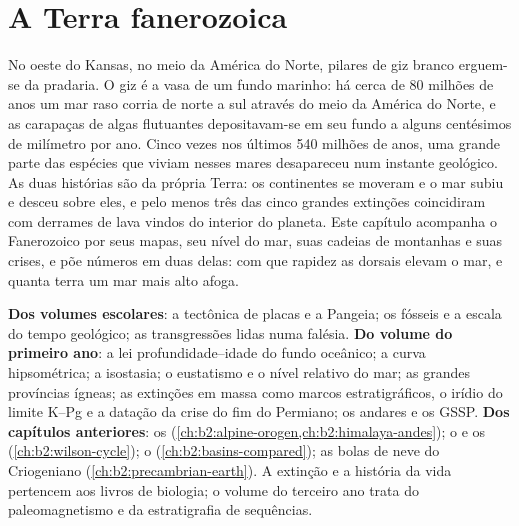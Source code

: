 \chapter{A Terra fanerozoica}\label{ch:b2:phanerozoic-earth}

No oeste do Kansas, no meio da América do Norte, pilares de giz branco erguem-se da
pradaria. O giz é a vasa de um fundo marinho: há cerca de 80 milhões de anos um
mar raso corria de norte a sul através do meio da América do Norte, e as carapaças de
algas flutuantes depositavam-se em seu fundo a alguns centésimos de milímetro por ano. Cinco vezes nos
últimos 540 milhões de anos, uma grande parte das espécies que viviam nesses mares desapareceu num
instante geológico. As duas histórias são da própria Terra: os continentes se moveram e o mar subiu e desceu sobre
eles, e pelo menos três das cinco grandes extinções coincidiram com derrames de lava vindos do interior
do planeta. Este capítulo acompanha o Fanerozoico por seus mapas, seu nível do mar, suas cadeias de
montanhas e suas crises, e põe números em duas delas: com que rapidez as dorsais elevam o mar, e quanta
terra um mar mais alto afoga.

\begin{recall}
\textbf{Dos volumes escolares}: a tectônica de placas e a Pangeia; os fósseis e a escala do tempo
geológico; as transgressões lidas numa falésia. \textbf{Do volume do primeiro ano}: a lei profundidade--idade
do fundo oceânico; a curva hipsométrica; a isostasia; o eustatismo e o nível relativo do mar; as grandes províncias
ígneas; as extinções em massa como marcos estratigráficos, o irídio do limite K--Pg e a
datação da crise do fim do Permiano; os andares e os GSSP. \textbf{Dos capítulos anteriores}: os 
(\cref{ch:b2:alpine-orogen,ch:b2:himalaya-andes}); o  e os 
(\cref{ch:b2:wilson-cycle}); o  (\cref{ch:b2:basins-compared}); as bolas de neve do
Criogeniano (\cref{ch:b2:precambrian-earth}). A extinção e a história da vida pertencem aos
livros de biologia; o volume do terceiro ano trata do paleomagnetismo e da estratigrafia de sequências.
\end{recall}


